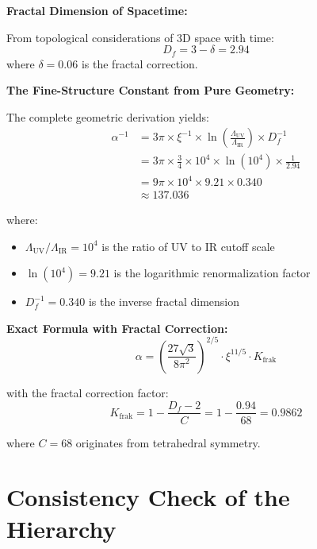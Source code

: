\documentclass[12pt,a4paper]{article}
\newcommand{\xipar}{\xi}
\begin{document}
	\begin{keyresult}
		\textbf{Fractal Dimension of Spacetime:}
		
		From topological considerations of 3D space with time:
		\begin{equation}
			D_f = 3 - \delta = 2.94
		\end{equation}
		where $\delta = 0.06$ is the fractal correction.
		
		\textbf{The Fine-Structure Constant from Pure Geometry:}
		
		The complete geometric derivation yields:
		\begin{align}
			\alpha^{-1} &= 3\pi \times \xipar^{-1} \times \ln\left(\frac{\Lambda_{\text{UV}}}{\Lambda_{\text{IR}}}\right) \times D_f^{-1} \\
			&= 3\pi \times \frac{3}{4} \times 10^{4} \times \ln(10^{4}) \times \frac{1}{2.94} \\
			&= 9\pi \times 10^{4} \times 9.21 \times 0.340 \\
			&\approx 137.036
		\end{align}
		
		where:
		\begin{itemize}
			\item $\Lambda_{\text{UV}}/\Lambda_{\text{IR}} = 10^4$ is the ratio of UV to IR cutoff scale
			\item $\ln(10^4) = 9.21$ is the logarithmic renormalization factor
			\item $D_f^{-1} = 0.340$ is the inverse fractal dimension
		\end{itemize}
		
		\textbf{Exact Formula with Fractal Correction:}
		\begin{equation}
			\boxed{\alpha = \left(\frac{27\sqrt{3}}{8\pi^2}\right)^{2/5} \cdot \xipar^{11/5} \cdot K_{\text{frak}}}
		\end{equation}
		
		with the fractal correction factor:
		\begin{equation}
			K_{\text{frak}} = 1 - \frac{D_f - 2}{C} = 1 - \frac{0.94}{68} = 0.9862
		\end{equation}
		
		where $C = 68$ originates from tetrahedral symmetry.
	\end{keyresult}
	
	\section{Consistency Check of the Hierarchy}
	
\end{document}
